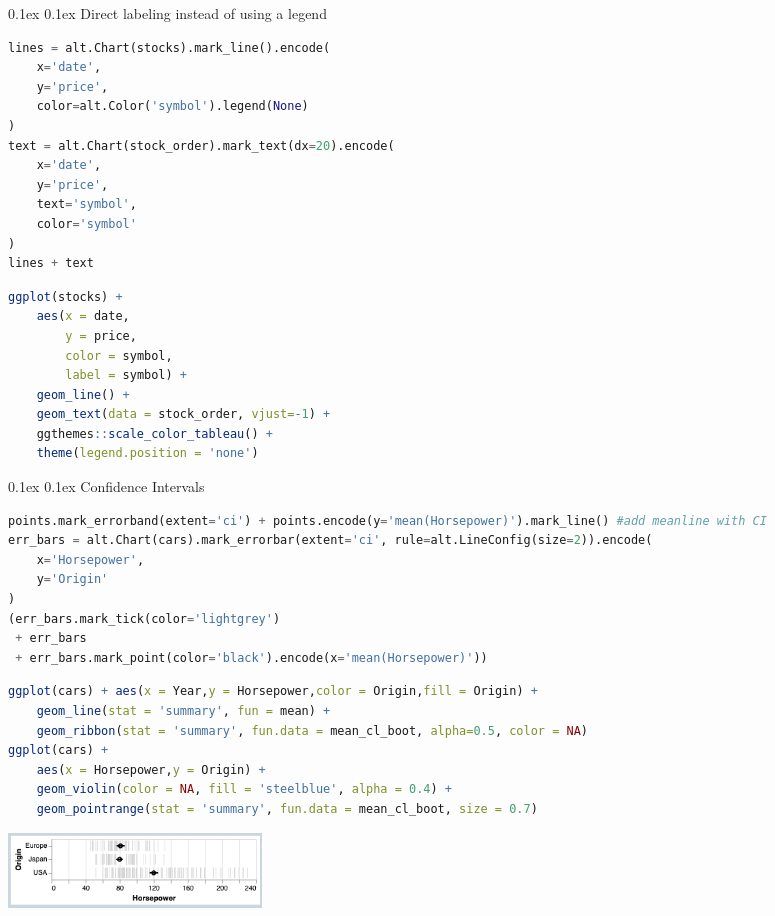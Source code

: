 \documentclass[8pt,landscape]{article}
\makeatletter
\renewcommand{\subsection}{\@startsection{subsection}{2}{0pt}%
    {0.1ex}%
    {0.1ex}%
    {\fontsize{8}{9}\bfseries\color{blue}}} %
\makeatother
\begin{document}
\begin{multicols}{3}
\subsection{Direct labeling instead of using a legend}
\begin{lstlisting}[language=Python]
lines = alt.Chart(stocks).mark_line().encode(
    x='date',
    y='price',
    color=alt.Color('symbol').legend(None)
)
text = alt.Chart(stock_order).mark_text(dx=20).encode(
    x='date',
    y='price',
    text='symbol',
    color='symbol'
)
lines + text
\end{lstlisting}
\begin{lstlisting}[language=R]
ggplot(stocks) + 
    aes(x = date,
        y = price,
        color = symbol,
        label = symbol) +
    geom_line() +
    geom_text(data = stock_order, vjust=-1) +
    ggthemes::scale_color_tableau() +
    theme(legend.position = 'none')
\end{lstlisting}

\subsection{Confidence Intervals}
\begin{lstlisting}[language=Python]
points.mark_errorband(extent='ci') + points.encode(y='mean(Horsepower)').mark_line() #add meanline with CI
err_bars = alt.Chart(cars).mark_errorbar(extent='ci', rule=alt.LineConfig(size=2)).encode(
    x='Horsepower',
    y='Origin'
)
(err_bars.mark_tick(color='lightgrey')
 + err_bars
 + err_bars.mark_point(color='black').encode(x='mean(Horsepower)'))
\end{lstlisting}
\begin{lstlisting}[language=R]
ggplot(cars) + aes(x = Year,y = Horsepower,color = Origin,fill = Origin) +
    geom_line(stat = 'summary', fun = mean) +
    geom_ribbon(stat = 'summary', fun.data = mean_cl_boot, alpha=0.5, color = NA)
ggplot(cars) +
    aes(x = Horsepower,y = Origin) +
    geom_violin(color = NA, fill = 'steelblue', alpha = 0.4) +
    geom_pointrange(stat = 'summary', fun.data = mean_cl_boot, size = 0.7)
\end{lstlisting}
\includegraphics[width=0.5\linewidth, height=2cm]{ci.png}


\end{multicols}
\end{document}
